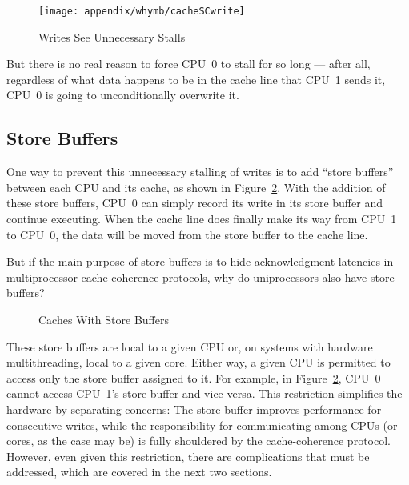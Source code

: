 \begin{figure}[htb]
\begin{center}
\texttt{[image: appendix/whymb/cacheSCwrite]}
\end{center}
\caption{Writes See Unnecessary Stalls}
\label{fig:app:whymb:Writes See Unnecessary Stalls}
\end{figure}

But there is no real reason to force CPU~0 to stall for so long --- after
all, regardless of what data happens to be in the cache line that CPU~1
sends it, CPU~0 is going to unconditionally overwrite it.

\subsection{Store Buffers}
\label{sec:app:whymb:Store Buffers}

One way to prevent this unnecessary stalling of writes is to add
``store buffers'' between each CPU and its cache, as shown in
Figure~\ref{fig:app:whymb:Caches With Store Buffers}.
With the addition of these store buffers, CPU~0 can simply record
its write in its store buffer and continue executing.
When the cache line does finally make its way from CPU~1 to CPU~0,
the data will be moved from the store buffer to the cache line.

\QuickQuiz{}
	But if the main purpose of store buffers is to hide acknowledgment
	latencies in multiprocessor cache-coherence protocols, why
	do uniprocessors also have store buffers?
 \QuickQuizEnd

\begin{figure}[htb]
\begin{center}
\end{center}
\caption{Caches With Store Buffers}
\label{fig:app:whymb:Caches With Store Buffers}
\end{figure}

These store buffers are local to a given CPU or, on systems with
hardware multithreading, local to a given core.
Either way, a given CPU is permitted to access only the store buffer
assigned to it.
For example, in
Figure~\ref{fig:app:whymb:Caches With Store Buffers}, CPU~0 cannot
access CPU~1's store buffer and vice versa.
This restriction simplifies the hardware by separating concerns:
The store buffer improves performance for consecutive writes, while
the responsibility for communicating among CPUs (or cores, as the
case may be) is fully shouldered by the cache-coherence protocol.
However, even given this restriction, there are complications that must
be addressed, which are covered in the next two sections.

